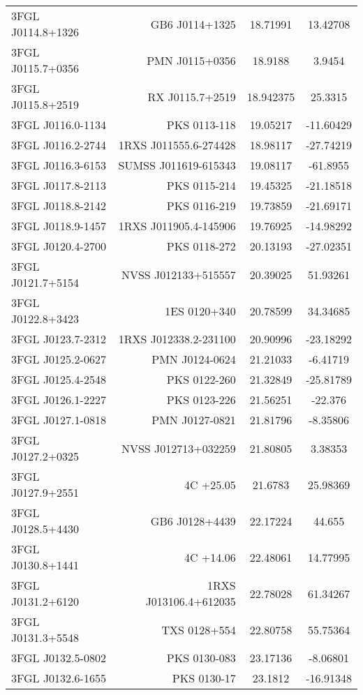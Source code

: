 \begin{table}
\begin{tabular}{l r c c}
3FGL J0114.8+1326  &  GB6 J0114+1325  &  18.71991  &  13.42708  \\
3FGL J0115.7+0356  &  PMN J0115+0356  &  18.9188  &  3.9454  \\
3FGL J0115.8+2519  &  RX J0115.7+2519  &  18.942375  &  25.3315  \\
3FGL J0116.0-1134  &  PKS 0113-118  &  19.05217  &  -11.60429  \\
3FGL J0116.2-2744  &  1RXS J011555.6-274428  &  18.98117  &  -27.74219  \\
3FGL J0116.3-6153  &  SUMSS J011619-615343  &  19.08117  &  -61.8955  \\
3FGL J0117.8-2113  &  PKS 0115-214  &  19.45325  &  -21.18518  \\
3FGL J0118.8-2142  &  PKS 0116-219  &  19.73859  &  -21.69171  \\
3FGL J0118.9-1457  &  1RXS J011905.4-145906  &  19.76925  &  -14.98292  \\
3FGL J0120.4-2700  &  PKS 0118-272  &  20.13193  &  -27.02351  \\
3FGL J0121.7+5154  &  NVSS J012133+515557  &  20.39025  &  51.93261  \\
3FGL J0122.8+3423  &  1ES 0120+340  &  20.78599  &  34.34685  \\
3FGL J0123.7-2312  &  1RXS J012338.2-231100  &  20.90996  &  -23.18292  \\
3FGL J0125.2-0627  &  PMN J0124-0624  &  21.21033  &  -6.41719  \\
3FGL J0125.4-2548  &  PKS 0122-260  &  21.32849  &  -25.81789  \\
3FGL J0126.1-2227  &  PKS 0123-226  &  21.56251  &  -22.376  \\
3FGL J0127.1-0818  &  PMN J0127-0821  &  21.81796  &  -8.35806  \\
3FGL J0127.2+0325  &  NVSS J012713+032259  &  21.80805  &  3.38353  \\
3FGL J0127.9+2551  &  4C +25.05  &  21.6783  &  25.98369  \\
3FGL J0128.5+4430  &  GB6 J0128+4439  &  22.17224  &  44.655  \\
3FGL J0130.8+1441  &  4C +14.06  &  22.48061  &  14.77995  \\
3FGL J0131.2+6120  &  1RXS J013106.4+612035  &  22.78028  &  61.34267  \\
3FGL J0131.3+5548  &  TXS 0128+554  &  22.80758  &  55.75364  \\
3FGL J0132.5-0802  &  PKS 0130-083  &  23.17136  &  -8.06801  \\
3FGL J0132.6-1655  &  PKS 0130-17  &  23.1812  &  -16.91348  \\

\end{tabular}
\end{table}
